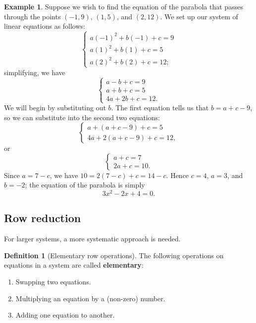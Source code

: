 \documentclass[a4paper,leqno]{article}
\numberwithin{equation}{section}
\theoremstyle{definition}
\newtheorem{defn}[equation]{Definition}
\newtheorem{ex}[equation]{Example}
\theoremstyle{remark}
\newcommand{\df}[1]{\textbf{#1}}
\begin{document}
\begin{ex}
  Suppose we wish to find the equation of the parabola that passes through the points $ (-1, 9) $, $ (1, 5) $, and $ (2, 12) $. We
  set up our system of linear equations as follows:
  \begin{equation*}
    \begin{cases}
      a(-1)^2 + b(-1) + c = 9\\
      a(1)^2 + b(1) + c = 5\\
      a(2)^2 + b(2) + c = 12;
    \end{cases}
  \end{equation*}
  simplifying, we have
  \begin{equation}
    \begin{cases}
      a - b + c = 9\\
      a + b + c = 5\\
      4a + 2b + c = 12.
    \end{cases}
  \end{equation}
  We will begin by substituting out $ b $. The first equation tells us that $ b = a + c - 9 $, so we can substitute into the second two equations:
  \begin{equation*}
    \begin{cases}
      a + (a + c - 9) + c = 5\\
      4a + 2(a + c - 9) + c = 12,
    \end{cases}
  \end{equation*}
  or
  \begin{equation*}
    \begin{cases}
      a + c = 7\\
      2a + c = 10.
    \end{cases}
  \end{equation*}
  Since $ a = 7 - c $, we have $ 10 = 2(7 - c) + c = 14 - c $. Hence $ c = 4 $, $ a = 3 $, and $ b = -2 $; the equation of the parabola
  is simply
  \begin{displaymath}
    3x^2 - 2x + 4 = 0.
  \end{displaymath}
\end{ex}

\subsection{Row reduction}
For larger systems, a more systematic approach is needed.

\begin{defn}[Elementary row operations]
  The following operations on equations in a system are called \df{elementary}:
  \begin{enumerate}
    \item Swapping two equations.
    \item Multiplying an equation by a (non-zero) number.
    \item Adding one equation to another.
  \end{enumerate}
\end{defn}
\end{document}
